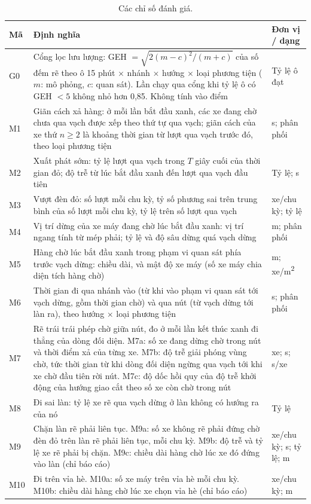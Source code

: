 \documentclass[../main.tex]{subfiles}
\begin{document}
\begin{table}[!htbp]
\centering
\small
\caption{Các chỉ số đánh giá.}
\label{table:3.3}
\begin{tabular}{|p{1.0cm}|>{\raggedright\arraybackslash}p{9.2cm}|>{\raggedright\arraybackslash}p{3.0cm}|}
\hline
\textbf{Mã} & \textbf{Định nghĩa} & \textbf{Đơn vị / dạng} \\ \hline
G0 & Cổng lọc lưu lượng: GEH $=\sqrt{2(m-c)^2/(m+c)}$ của số đếm rẽ theo ô 15 phút $\times$ nhánh $\times$ hướng $\times$ loại phương tiện ($m$: mô phỏng, $c$: quan sát). Lần chạy qua cổng khi tỷ lệ ô có GEH $<5$ không nhỏ hơn 0,85. Không tính vào điểm & Tỷ lệ ô đạt \\ \hline
M1 & Giãn cách xả hàng: ở mỗi lần bắt đầu xanh, các xe đang chờ chưa qua vạch được xếp theo thứ tự qua vạch; giãn cách của xe thứ $n \ge 2$ là khoảng thời gian từ lượt qua vạch trước đó, theo loại phương tiện & s; phân phối \\ \hline
M2 & Xuất phát sớm: tỷ lệ lượt qua vạch trong $T$ giây cuối của thời gian đỏ; độ trễ từ lúc bắt đầu xanh đến lượt qua vạch đầu tiên & Tỷ lệ; s \\ \hline
M3 & Vượt đèn đỏ: số lượt mỗi chu kỳ, tỷ số phương sai trên trung bình của số lượt mỗi chu kỳ, tỷ lệ trên số lượt qua vạch & xe/chu kỳ; tỷ lệ \\ \hline
M4 & Vị trí dừng của xe máy đang chờ lúc bắt đầu xanh: vị trí ngang tính từ mép phải; tỷ lệ và độ sâu dừng quá vạch dừng & m; phân phối \\ \hline
M5 & Hàng chờ lúc bắt đầu xanh trong phạm vi quan sát phía trước vạch dừng: chiều dài, và mật độ xe máy (số xe máy chia diện tích hàng chờ) & m; xe/m\textsuperscript{2} \\ \hline
M6 & Thời gian đi qua nhánh vào (từ khi vào phạm vi quan sát tới vạch dừng, gồm thời gian chờ) và qua nút (từ vạch dừng tới làn ra), theo hướng $\times$ loại phương tiện & s; phân phối \\ \hline
M7 & Rẽ trái trái phép chờ giữa nút, đo ở mỗi lần kết thúc xanh đi thẳng của dòng đối diện. M7a: số xe đang dừng chờ trong nút và thời điểm xả của từng xe. M7b: độ trễ giải phóng vùng chờ, tức thời gian từ khi dòng đối diện ngừng qua vạch tới khi xe chờ đầu tiên rời nút. M7c: độ dốc hồi quy của độ trễ khởi động của hướng giao cắt theo số xe còn chờ trong nút & xe; s; s/xe \\ \hline
M8 & Đi sai làn: tỷ lệ xe rẽ qua vạch dừng ở làn không có hướng ra của nó & Tỷ lệ \\ \hline
M9 & Chặn làn rẽ phải liên tục. M9a: số xe không rẽ phải đứng chờ đèn đỏ trên làn rẽ phải liên tục, mỗi chu kỳ. M9b: độ trễ và tỷ lệ xe rẽ phải bị chặn. M9c: chiều dài hàng chờ lúc xe đó đứng vào làn (chỉ báo cáo) & xe/chu kỳ; s; tỷ lệ; m \\ \hline
M10 & Đi trên vỉa hè. M10a: số xe máy trên vỉa hè mỗi chu kỳ. M10b: chiều dài hàng chờ lúc xe chọn vỉa hè (chỉ báo cáo) & xe/chu kỳ; m \\ \hline
\end{tabular}
\end{table}
\end{document}
